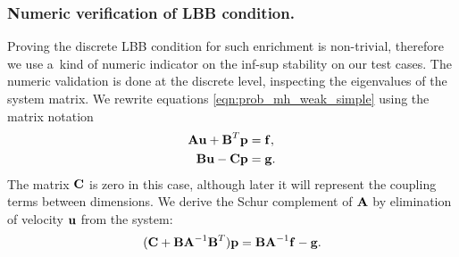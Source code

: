 
\subsubsection{Numeric verification of LBB condition.}

Proving the discrete LBB condition for such enrichment is non-trivial,
therefore we use a~kind of numeric indicator on the inf-sup stability on our test cases.
The numeric validation is done at the discrete level, inspecting the eigenvalues of the system matrix.
We rewrite equations \eqref{eqn:prob_mh_weak_simple} using the matrix notation
\begin{align}
    \textbf{\textrm{A}} \textbf{\textrm{u}} + \textbf{\textrm{B}}^T\textbf{\textrm{p}} &= \textbf{\textrm{f}}, \\
    \textbf{\textrm{B}} \textbf{\textrm{u}} - \textbf{\textrm{C}}  \textbf{\textrm{p}} &= \textbf{\textrm{g}}.
\end{align}
The matrix $\textbf{\textrm{C}}$ is zero in this case, although later it will represent the coupling terms between dimensions.
We derive the Schur complement of $\textbf{\textrm{A}}$ by elimination of velocity $\textbf{\textrm{u}}$ from the system:
\begin{equation}
    (\textbf{\textrm{C}} + \textbf{\textrm{B}}\textbf{\textrm{A}}^{-1}\textbf{\textrm{B}}^T) \textbf{\textrm{p}} = \textbf{\textrm{B}} \textbf{\textrm{A}}^{-1} \textbf{\textrm{f}} - \textbf{\textrm{g}}.
\end{equation}

